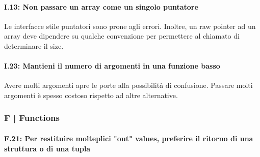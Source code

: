 \paragraph{I.13: Non passare un array come un singolo puntatore}

\textsf{\small Le interfacce stile puntatori sono prone agli errori. Inoltre, un raw pointer ad un array deve dipendere su qualche convenzione per permettere al chiamato di determinare il size. } \\

\paragraph{I.23: Mantieni il numero di argomenti in una funzione basso}

\textsf{\small Avere molti argomenti apre le porte alla possibilità di confusione. Passare molti argomenti è spesso costoso rispetto ad altre alternative.} \\

\subsubsection{F | Functions}

\paragraph{F.21: Per restituire molteplici "out" values, preferire il ritorno di una struttura o di una tupla}

